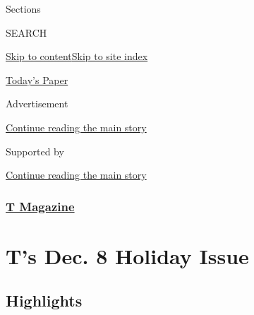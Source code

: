 Sections

SEARCH

\protect\hyperlink{site-content}{Skip to
content}\protect\hyperlink{site-index}{Skip to site index}

\href{https://myaccount.nytimes.com/auth/login?response_type=cookie\&client_id=vi}{}

\href{https://www.nytimes.com/section/todayspaper}{Today's Paper}

Advertisement

\protect\hyperlink{after-top}{Continue reading the main story}

Supported by

\protect\hyperlink{after-sponsor}{Continue reading the main story}

\hypertarget{t-magazine}{%
\subsubsection{\texorpdfstring{\href{/section/t-magazine}{T
Magazine}}{T Magazine}}\label{t-magazine}}

\hypertarget{ts-dec-8-holiday-issue}{%
\section{T's Dec. 8 Holiday Issue}\label{ts-dec-8-holiday-issue}}

\hypertarget{highlights}{%
\subsection{Highlights}\label{highlights}}

